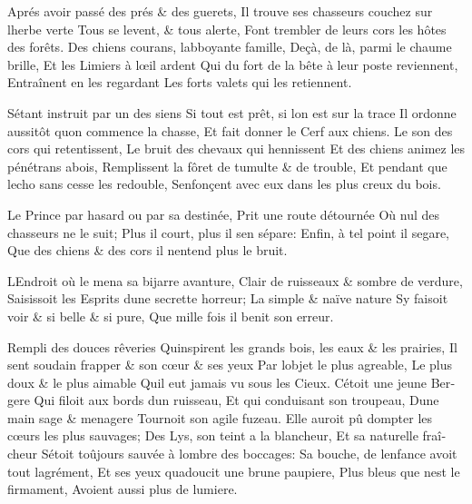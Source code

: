 \documentclass[14pt,a4paper]{memoir}
\begin{document}
{{\begin{otherlanguage}{french}
{Aprés avoir passé des prés \& des guerets,} {Il trouve ses chasseurs
couchez sur l\textquotesingle herbe verte } {Tous se levent, \& tous
alerte,} {Font trembler de leurs cors les hôtes des forêts. } {Des
chiens courans, l\textquotesingle abboyante famille,} {Deçà, de là,
parmi le chaume brille,} {Et les Limiers à l\textquotesingle œil ardent}
{Qui du fort de la bête à leur poste reviennent, } {Entraînent en les
regardant} {Les forts valets qui les retiennent.}

{S\textquotesingle étant instruit par un des siens} {Si tout est prêt,
si l\textquotesingle on est sur la trace} {Il ordonne aussitôt
qu\textquotesingle on commence la chasse,} {Et fait donner le Cerf aux
chiens.} {Le son des cors qui retentissent,} {Le bruit des chevaux qui
hennissent} {Et des chiens animez les pénétrans abois,} {Remplissent la
fôret de tumulte \& de trouble, } {Et pendant que l\textquotesingle echo
sans cesse les redouble,} {S\textquotesingle enfonçent avec eux dans les
plus creux du bois. }

{Le Prince par hasard ou par sa destinée,} {Prit une route détournée}
{Où nul des chasseurs ne le suit;} {Plus il court, plus il
s\textquotesingle en sépare:} {Enfin, à tel point il
s\textquotesingle egare,} {Que des chiens \& des cors il
n\textquotesingle entend plus le bruit.}

{L\textquotesingle Endroit où le mena sa bijarre avanture,} {Clair de
ruisseaux \& sombre de verdure,} {Saisissoit les Esprits
d\textquotesingle une secrette horreur;} {La simple \& naïve nature}
{S\textquotesingle y faisoit voir \& si belle \& si pure,} {Que mille
fois il benit son erreur.}

{Rempli des douces rêveries} {Qu\textquotesingle inspirent les grands
bois, les eaux \& les prairies,} {Il sent soudain frapper \& son cœur \&
ses yeux} {Par l\textquotesingle objet le plus agreable,} {Le plus doux
\& le plus aimable} {Qu\textquotesingle il eut jamais vu sous les
Cieux.} {C\textquotesingle étoit une jeune Bergere} {Qui filoit aux
bords d\textquotesingle un ruisseau,} {Et qui conduisant son troupeau,}
{D\textquotesingle une main sage \& menagere} {Tournoit son agile
fuzeau.} {Elle auroit pû dompter les cœurs les plus sauvages;} {Des Lys,
son teint a la blancheur,} {Et sa naturelle fraîcheur}
{S\textquotesingle étoit toûjours sauvée à l\textquotesingle ombre des
boccages: } {Sa bouche, de l\textquotesingle enfance avoit tout
l\textquotesingle agrément,} {Et ses yeux qu\textquotesingle adoucit une
brune paupiere,} {Plus bleus que n\textquotesingle est le firmament,}
{Avoient aussi plus de lumiere.}


\end{otherlanguage}}}
\end{document}
